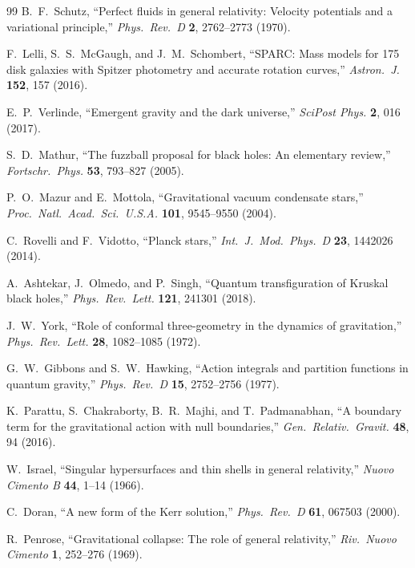 \documentclass[11pt,a4paper]{article}
\theoremstyle{plain}
\theoremstyle{definition}
\theoremstyle{remark}
\numberwithin{equation}{section}
\begin{document}
\begin{thebibliography}{99}
B.~F.~Schutz, ``Perfect fluids in general relativity: Velocity potentials and a variational principle,'' \textit{Phys.\ Rev.\ D} \textbf{2}, 2762--2773 (1970).

F.~Lelli, S.~S.~McGaugh, and J.~M.~Schombert, ``SPARC: Mass models for 175 disk galaxies with Spitzer photometry and accurate rotation curves,'' \textit{Astron.\ J.} \textbf{152}, 157 (2016).

E.~P.~Verlinde, ``Emergent gravity and the dark universe,'' \textit{SciPost Phys.} \textbf{2}, 016 (2017).

S.~D.~Mathur, ``The fuzzball proposal for black holes: An elementary review,'' \textit{Fortschr.\ Phys.} \textbf{53}, 793--827 (2005).

P.~O.~Mazur and E.~Mottola, ``Gravitational vacuum condensate stars,'' \textit{Proc.\ Natl.\ Acad.\ Sci.\ U.S.A.} \textbf{101}, 9545--9550 (2004).

C.~Rovelli and F.~Vidotto, ``Planck stars,'' \textit{Int.\ J.\ Mod.\ Phys.\ D} \textbf{23}, 1442026 (2014).

A.~Ashtekar, J.~Olmedo, and P.~Singh, ``Quantum transfiguration of Kruskal black holes,'' \textit{Phys.\ Rev.\ Lett.} \textbf{121}, 241301 (2018).

J.~W.~York, ``Role of conformal three-geometry in the dynamics of gravitation,'' \textit{Phys.\ Rev.\ Lett.} \textbf{28}, 1082--1085 (1972).

G.~W.~Gibbons and S.~W.~Hawking, ``Action integrals and partition functions in quantum gravity,'' \textit{Phys.\ Rev.\ D} \textbf{15}, 2752--2756 (1977).

K.~Parattu, S.~Chakraborty, B.~R.~Majhi, and T.~Padmanabhan, ``A boundary term for the gravitational action with null boundaries,'' \textit{Gen.\ Relativ.\ Gravit.} \textbf{48}, 94 (2016).

W.~Israel, ``Singular hypersurfaces and thin shells in general relativity,'' \textit{Nuovo Cimento B} \textbf{44}, 1--14 (1966).

C.~Doran, ``A new form of the Kerr solution,'' \textit{Phys.\ Rev.\ D} \textbf{61}, 067503 (2000).

R.~Penrose, ``Gravitational collapse: The role of general relativity,'' \textit{Riv.\ Nuovo Cimento} \textbf{1}, 252--276 (1969).


\end{thebibliography}
\end{document}
